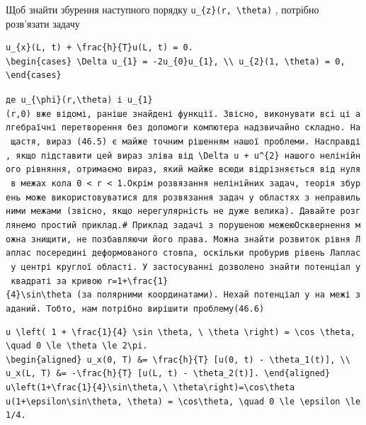 \documentclass[
  ukrainian,
]{article}
\begin{document}
Щоб знайти збурення наступного порядку
\texttt{u\_\{z\}(r,\ \textbackslash{}theta)} , потрібно розв'язати
задачу

\begin{verbatim}
u_{x}(L, t) + \frac{h}{T}u(L, t) = 0.
\begin{cases} \Delta u_{1} = -2u_{0}u_{1}, \\ u_{2}(1, \theta) = 0, \end{cases}
\end{verbatim}

\texttt{де\ \textquotesingle{}u\_\{\textbackslash{}phi\}(r,\textbackslash{}theta)\textquotesingle{}\ і\ \textquotesingle{}u\_\{1\}(r,0)\textquotesingle{}\ вже\ відомі,\ раніше\ знайдені\ функції.\ Звісно,\ виконувати\ всі\ ці\ алгебраїчні\ перетворення\ без\ допомоги\ комп\textquotesingle{}ютера\ надзвичайно\ складно.\ На\ щастя,\ вираз\ (46.5)\ є\ майже\ точним\ рішенням\ нашої\ проблеми.\ Насправді,\ якщо\ підставити\ цей\ вираз\ зліва\ від\ \textquotesingle{}\textbackslash{}Delta\ u\ +\ u\^{}\{2\}\textquotesingle{}\ нашого\ нелінійного\ рівняння,\ отримаємо\ вираз,\ який\ майже\ всюди\ відрізняється\ від\ нуля\ в\ межах\ кола\ 0\ \textless{}\ r\ \textless{}\ 1.Окрім\ розв\textquotesingle{}язання\ нелінійних\ задач,\ теорія\ збурень\ може\ використовуватися\ для\ розв\textquotesingle{}язання\ задач\ у\ областях\ з\ неправильними\ межами\ (звісно,\ якщо\ нерегулярність\ не\ дуже\ велика).\ Давайте\ розглянемо\ простий\ приклад.\#\ Приклад\ задачі\ з\ порушеною\ межеюОсквернення\ можна\ знищити,\ не\ позбавляючи\ його\ права.\ Можна\ знайти\ розвиток\ рівня\ Лаплас\ посередині\ деформованого\ стовпа,\ оскільки\ пробурив\ рівень\ Лаплас\ у\ центрі\ круглої\ області.\ У\ застосуванні\ дозволено\ знайти\ потенціал\ у\ квадраті\ за\ кривою\ \textquotesingle{}r=1+\textbackslash{}frac\{1\}\{4\}\textbackslash{}sin\textbackslash{}theta\textquotesingle{}\ (за\ полярними\ координатами).\ Нехай\ потенціал\ у\ на\ межі\ заданий.\ Тобто,\ нам\ потрібно\ вирішити\ проблему(46.6)}

\begin{verbatim}
u \left( 1 + \frac{1}{4} \sin \theta, \ \theta \right) = \cos \theta, \quad 0 \le \theta \le 2\pi.
\begin{aligned} u_x(0, T) &= \frac{h}{T} [u(0, t) - \theta_1(t)], \\ u_x(L, T) &= -\frac{h}{T} [u(L, t) - \theta_2(t)]. \end{aligned}
u\left(1+\frac{1}{4}\sin\theta,\ \theta\right)=\cos\theta
u(1+\epsilon\sin\theta, \theta) = \cos\theta, \quad 0 \le \epsilon \le 1/4.
\end{verbatim}
\end{document}
